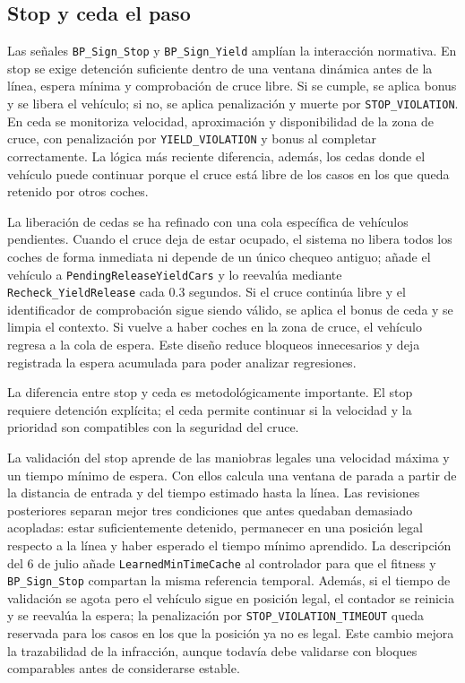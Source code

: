\subsection{Stop y ceda el paso}

Las señales \texttt{BP\_Sign\_Stop} y \texttt{BP\_Sign\_Yield} amplían la interacción normativa. En stop se exige detención suficiente dentro de una ventana dinámica antes de la línea, espera mínima y comprobación de cruce libre. Si se cumple, se aplica bonus y se libera el vehículo; si no, se aplica penalización y muerte por \texttt{STOP\_VIOLATION}. En ceda se monitoriza velocidad, aproximación y disponibilidad de la zona de cruce, con penalización por \texttt{YIELD\_VIOLATION} y bonus al completar correctamente. La lógica más reciente diferencia, además, los cedas donde el vehículo puede continuar porque el cruce está libre de los casos en los que queda retenido por otros coches.

La liberación de cedas se ha refinado con una cola específica de vehículos pendientes. Cuando el cruce deja de estar ocupado, el sistema no libera todos los coches de forma inmediata ni depende de un único chequeo antiguo; añade el vehículo a \texttt{PendingReleaseYieldCars} y lo reevalúa mediante \texttt{Recheck\_YieldRelease} cada 0.3 segundos. Si el cruce continúa libre y el identificador de comprobación sigue siendo válido, se aplica el bonus de ceda y se limpia el contexto. Si vuelve a haber coches en la zona de cruce, el vehículo regresa a la cola de espera. Este diseño reduce bloqueos innecesarios y deja registrada la espera acumulada para poder analizar regresiones.

La diferencia entre stop y ceda es metodológicamente importante. El stop requiere detención explícita; el ceda permite continuar si la velocidad y la prioridad son compatibles con la seguridad del cruce.

La validación del stop aprende de las maniobras legales una velocidad máxima y un tiempo mínimo de espera. Con ellos calcula una ventana de parada a partir de la distancia de entrada y del tiempo estimado hasta la línea. Las revisiones posteriores separan mejor tres condiciones que antes quedaban demasiado acopladas: estar suficientemente detenido, permanecer en una posición legal respecto a la línea y haber esperado el tiempo mínimo aprendido. La descripción del 6 de julio añade \texttt{LearnedMinTimeCache} al controlador para que el fitness y \texttt{BP\_Sign\_Stop} compartan la misma referencia temporal. Además, si el tiempo de validación se agota pero el vehículo sigue en posición legal, el contador se reinicia y se reevalúa la espera; la penalización por \texttt{STOP\_VIOLATION\_TIMEOUT} queda reservada para los casos en los que la posición ya no es legal. Este cambio mejora la trazabilidad de la infracción, aunque todavía debe validarse con bloques comparables antes de considerarse estable.


